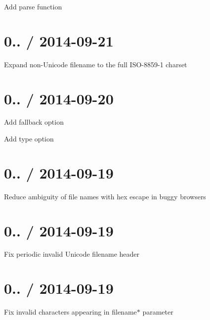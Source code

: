 
\begin{DoxyItemize}
\item Add {\ttfamily parse} function
\end{DoxyItemize}

\section*{0.. / 2014-\/09-\/21 }


\begin{DoxyItemize}
\item Expand non-\/\+Unicode {\ttfamily filename} to the full I\+S\+O-\/8859-\/1 charset
\end{DoxyItemize}

\section*{0.. / 2014-\/09-\/20 }


\begin{DoxyItemize}
\item Add {\ttfamily fallback} option
\item Add {\ttfamily type} option
\end{DoxyItemize}

\section*{0.. / 2014-\/09-\/19 }


\begin{DoxyItemize}
\item Reduce ambiguity of file names with hex escape in buggy browsers
\end{DoxyItemize}

\section*{0.. / 2014-\/09-\/19 }


\begin{DoxyItemize}
\item Fix periodic invalid Unicode filename header
\end{DoxyItemize}

\section*{0.. / 2014-\/09-\/19 }


\begin{DoxyItemize}
\item Fix invalid characters appearing in {\ttfamily filename$\ast$} parameter
\end{DoxyItemize}

